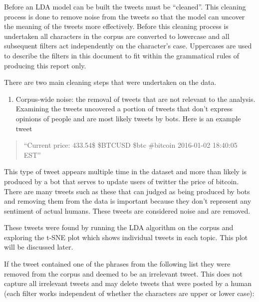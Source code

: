 \documentclass[
]{article}
\providecommand{\tightlist}{%
  \setlength{\itemsep}{0pt}\setlength{\parskip}{0pt}}
\begin{document}
Before an LDA model can be built the tweets must be ``cleaned''. This
cleaning process is done to remove noise from the tweets so that the
model can uncover the meaning of the tweets more effectively. Before
this cleaning process is undertaken all characters in the corpus are
converted to lowercase and all subsequent filters act independently on
the character's case. Uppercases are used to describe the filters in
this document to fit within the grammatical rules of producing this
report only.

There are two main cleaning steps that were undertaken on the data.

\begin{enumerate}
\def\labelenumi{\arabic{enumi}.}
\tightlist
\item
  Corpus-wide noise: the removal of tweets that are not relevant to the
  analysis. Examining the tweets uncovered a portion of tweets that
  don't express opinions of people and are most likely tweets by bots.
  Here is an example tweet
\end{enumerate}

\begin{quote}
``Current price: 433.54\$ \$BTCUSD \$btc \#bitcoin 2016-01-02 18:40:05
EST''
\end{quote}

This type of tweet appears multiple time in the dataset and more than
likely is produced by a bot that serves to update users of twitter the
price of bitcoin. There are many tweets such as these that can judged as
being produced by bots and removing them from the data is important
because they don't represent any sentiment of actual humans. These
tweets are considered noise and are removed.

These tweets were found by running the LDA algorithm on the corpus and
exploring the t-SNE plot which shows individual tweets in each topic.
This plot will be discussed later.

If the tweet contained one of the phrases from the following list they
were removed from the corpus and deemed to be an irrelevant tweet. This
does not capture all irrelevant tweets and may delete tweets that were
posted by a human (each filter works independent of whether the
characters are upper or lower case):
\end{document}
